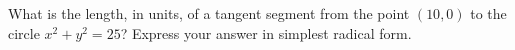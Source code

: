 What is the length, in units, of a tangent segment from the point $(10,0)$ to the circle $x^2+y^2=25$? Express your answer in simplest radical form.
